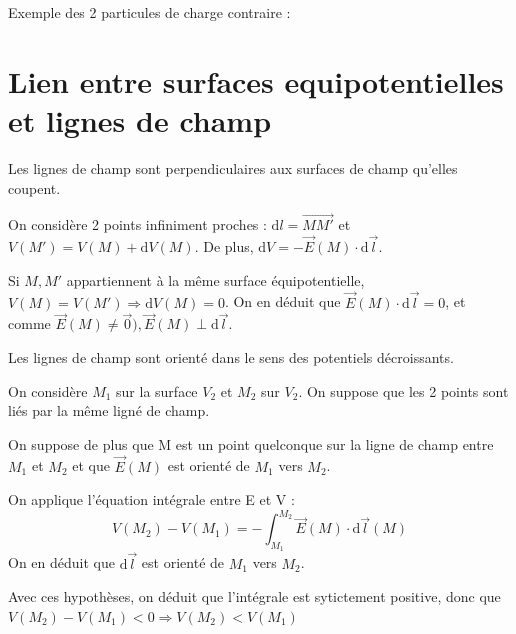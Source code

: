 \documentclass[french]{yLectureNote}
\renewcommand{\vec}{\overrightarrow}
\newcommand{\dd}{\mathrm{d}}
\newcommand{\E}{\vec{E}(M)}
\begin{document}
Exemple des 2 particules de charge contraire :


\section{Lien entre surfaces equipotentielles et lignes de champ}

\begin{theorem}
Les lignes de champ sont perpendiculaires aux surfaces de champ qu'elles coupent.
\end{theorem}
\begin{myproof}
 On considère 2 points infiniment proches : \(\dd l = \vec{MM'}\) et \(V(M') = V(M)+\dd V(M)\). De plus,  \(\dd V = -\E \cdot \dd \vec{l}\).

Si \(M, M'\) appartiennent à la m\^eme surface équipotentielle, \(V(M) = V(M') \Rightarrow \dd V(M) = 0\). On en déduit que \(\E\cdot \dd \vec{l} = 0\), et comme \(\E \neq \vec{0}), \E \perp \dd \vec{l}\).
\end{myproof}

\begin{theorem}
 Les lignes de champ sont orienté dans le sens des potentiels décroissants.
\end{theorem}
\begin{myproof}
 On considère \(M_1\) sur la surface \(V_2\) et \(M_2\) sur \(V_2\). On suppose que les 2 points sont liés par la m\^eme ligné de champ.

On suppose de plus que M est un point quelconque sur la ligne de champ entre \(M_1\) et \(M_2\) et que \(\E\) est orienté de \(M_1\) vers \(M_2\).

On applique l'équation intégrale entre E et V :
\begin{equation*}
V(M_2)-V(M_1) = -\int_{M_1}^{M_2}\E\cdot \dd \vec{l}(M)
\end{equation*}
On en déduit que \(\dd \vec{l}\) est orienté de \(M_1\) vers \(M_2\).

Avec ces hypothèses, on déduit que l'intégrale est sytictement positive, donc que \(V(M_2)-V(M_1) <0 \Rightarrow V(M_2)<V(M_1)\)
\end{myproof}

 
\end{document}
